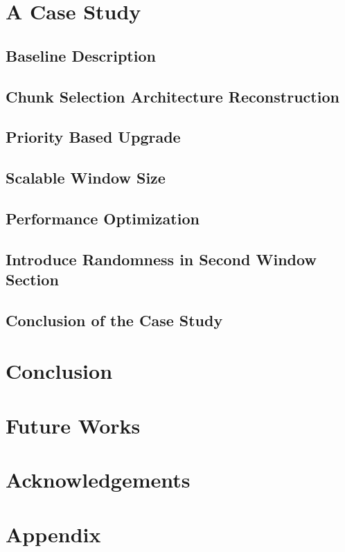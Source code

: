 \documentclass[11pt,a4paper]{article}
\begin{document}
\section{A Case Study}

\subsection{Baseline Description}

\subsection{Chunk Selection Architecture Reconstruction}


\subsection{Priority Based Upgrade}


\subsection{Scalable Window Size}


\subsection{Performance Optimization}


\subsection{Introduce Randomness in Second Window Section}


\subsection{Conclusion of the Case Study}




\section{Conclusion}

\section{Future Works}



\section*{Acknowledgements}




\pagebreak
\section*{Appendix}


\pagebreak
{}

\end{document}
